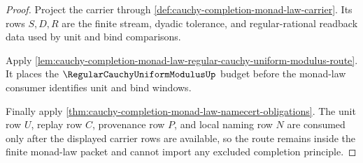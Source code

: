 \begin{proof}
Project the carrier through \autoref{def:cauchy-completion-monad-law-carrier}. Its rows $S,D,R$ are the finite stream, dyadic tolerance, and regular-rational readback data used by unit and bind comparisons.

Apply \autoref{lem:cauchy-completion-monad-law-regular-cauchy-uniform-modulus-route}. It places the $\RegularCauchyUniformModulusUp$ budget before the monad-law consumer identifies unit and bind windows.

Finally apply \autoref{thm:cauchy-completion-monad-law-namecert-obligations}. The unit row $U$, replay row $C$, provenance row $P$, and local naming row $N$ are consumed only after the displayed carrier rows are available, so the route remains inside the finite monad-law packet and cannot import any excluded completion principle.
\end{proof}
